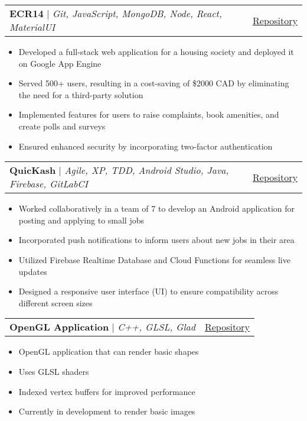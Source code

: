 \documentclass[letterpaper,11pt]{article}
\makeatletter
\newcommand{\resumeItem}[1]{
  \item\small{
    {#1 \vspace{-2pt}}
  }
}
\newcommand{\resumeProjectHeading}[2]{
    \item
    \begin{tabular*}{0.97\textwidth}{l@{\extracolsep{\fill}}r}
      \small#1 & #2 \\
    \end{tabular*}\vspace{-7pt}
}
\newcommand{\resumeItemListStart}{\begin{itemize}}
\newcommand{\resumeItemListEnd}{\end{itemize}\vspace{-5pt}}
\makeatother
\begin{document}
      \resumeProjectHeading
          {\textbf{ECR14} $|$ \emph{Git, JavaScript, MongoDB, Node, React, MaterialUI}}{\href{https://github.com/shamone03/ECR14}{\underline{Repository}}}
          \resumeItemListStart
            \resumeItem{Developed a full-stack web application for a housing society and deployed it on Google App Engine}
            \resumeItem{Served 500+ users, resulting in a cost-saving of \$2000 CAD by eliminating the need for a third-party solution}
            \resumeItem{Implemented features for users to raise complaints, book amenities, and create polls and surveys}
            \resumeItem{Ensured enhanced security by incorporating two-factor authentication}
          \resumeItemListEnd  
    
              
    \resumeProjectHeading
          {\textbf{QuicKash} $|$ \emph{Agile, XP, TDD, Android Studio, Java, Firebase, GitLabCI}}{\href{https://github.com/shamone03/quickash}{\underline{Repository}}}
          \resumeItemListStart
            \resumeItem{Worked collaboratively in a team of 7 to develop an Android application for posting and applying to small jobs}
            \resumeItem{Incorporated push notifications to inform users about new jobs in their area}
            \resumeItem{Utilized Firebase Realtime Database and Cloud Functions for seamless live updates}
            \resumeItem{Designed a responsive user interface (UI) to ensure compatibility across different screen sizes}
          \resumeItemListEnd


    \resumeProjectHeading
          {\textbf{OpenGL Application} $|$ \emph{C++, GLSL, Glad}}{\href{https://github.com/shamone03/OpenGL3DRenderer}{\underline{Repository}}}
          \resumeItemListStart
            \resumeItem{OpenGL application that can render basic shapes}
            \resumeItem{Uses GLSL shaders}
            \resumeItem{Indexed vertex buffers for improved performance}
            \resumeItem{Currently in development to render basic images}
          \resumeItemListEnd

          
\end{document}
